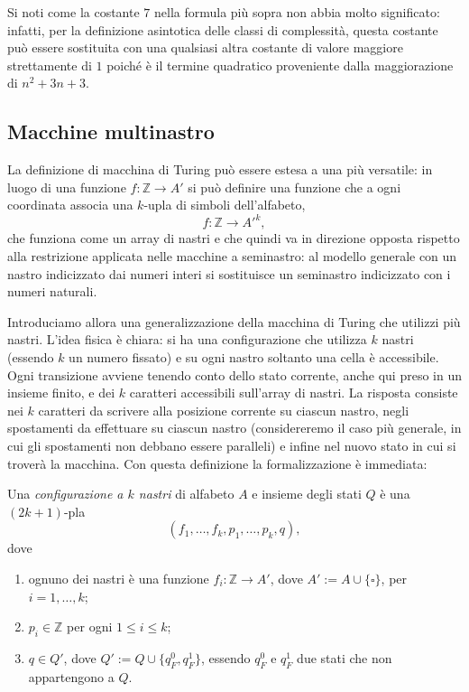 Si noti come la costante $7$ nella 
formula più sopra non abbia molto 
significato: 
infatti, per la definizione 
asintotica delle classi di complessità, 
questa costante può essere sostituita 
con una qualsiasi altra costante di 
valore maggiore strettamente di $1$ 
poiché è il termine quadratico 
proveniente dalla maggiorazione di 
$n^2+3n+3$.


\subsection{Macchine multinastro}

La definizione di macchina di Turing 
può essere estesa a una più versatile: in luogo di una funzione $f\colon \mathbb{Z}\to A'$ si può definire una funzione che a ogni coordinata associa una $k$-upla di simboli dell'alfabeto,
\[
f\colon \mathbb{Z}\to A'^k,
\]
che funziona come un array di nastri e che quindi va in direzione opposta rispetto alla restrizione applicata nelle macchine a seminastro: al modello generale con un nastro indicizzato dai numeri interi si sostituisce un seminastro indicizzato con i numeri naturali.

Introduciamo allora una generalizzazione della macchina di Turing che utilizzi più nastri. L'idea fisica è chiara: si ha una configurazione che utilizza $k$ nastri (essendo $k$ un numero fissato) e su ogni nastro soltanto una cella è accessibile. Ogni transizione avviene tenendo conto dello stato corrente, anche qui preso in un insieme finito, e dei $k$ caratteri accessibili sull'array di nastri. La risposta consiste nei $k$ caratteri da scrivere alla posizione corrente su ciascun nastro, negli spostamenti da effettuare su ciascun nastro (considereremo il caso più generale, in cui gli spostamenti non debbano essere paralleli) e infine nel nuovo stato in cui si troverà la macchina. Con questa definizione la formalizzazione è immediata:

\begin{defi}
Una \emph{configurazione a $k$ nastri} di alfabeto $A$ e insieme degli stati $Q$ è una $(2k+1)$-pla
\[
(f_1,\dots,f_k,p_1,\dots,p_k,q),
\]
dove
\begin{enumerate}
    \item ognuno dei nastri è una funzione $f_i\colon \mathbb{Z}\to A'$, dove $A' := A\cup\{\square\}$, per $i=1,\dots,k$;
    \item $p_i\in\mathbb{Z}$ per ogni $1\leq i\leq k$;
    \item $q\in Q'$, dove $Q' := Q\cup\{q_F^0,q_F^1\}$, essendo $q_F^0$ e $q_F^1$ due stati che non appartengono a $Q$.
\end{enumerate}
\end{defi}


